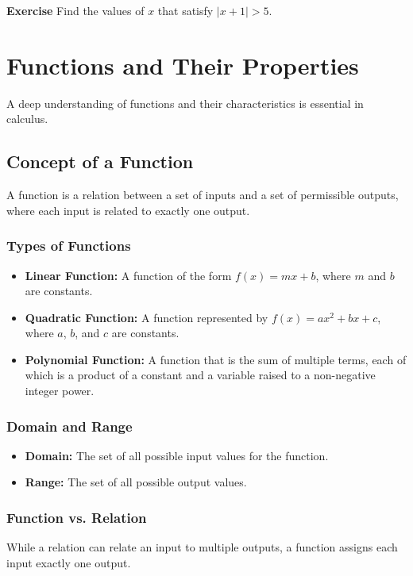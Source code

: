 \documentclass[a4paper,12pt]{book}
\newenvironment{exercise}[1][]
  {\par\medskip\noindent\textbf{Exercise #1} \rmfamily}
  {\medskip}
\begin{document}
\begin{exercise}
Find the values of \( x \) that satisfy \( |x + 1| > 5 \).
\end{exercise}



\section{Functions and Their Properties}
\label{sec:functions_and_properties}
A deep understanding of functions and their characteristics is essential in calculus.

\subsection{Concept of a Function}
\label{subsec:concept_of_function}
A function is a relation between a set of inputs and a set of permissible outputs, where each input is related to exactly one output. 

\subsubsection{Types of Functions}
\begin{itemize}
    \item \textbf{Linear Function:} A function of the form \( f(x) = mx + b \), where \( m \) and \( b \) are constants.
    \item \textbf{Quadratic Function:} A function represented by \( f(x) = ax^2 + bx + c \), where \( a \), \( b \), and \( c \) are constants.
    \item \textbf{Polynomial Function:} A function that is the sum of multiple terms, each of which is a product of a constant and a variable raised to a non-negative integer power.
\end{itemize}

\subsubsection{Domain and Range}
\begin{itemize}
    \item \textbf{Domain:} The set of all possible input values for the function.
    \item \textbf{Range:} The set of all possible output values.
\end{itemize}

\subsubsection{Function vs. Relation}
While a relation can relate an input to multiple outputs, a function assigns each input exactly one output.
\end{document}
